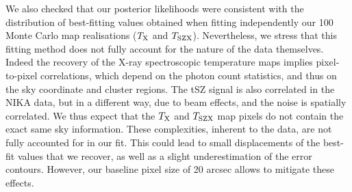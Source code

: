 \documentclass[twocolumn,traditabstract]{aa}
\newcommand{\ccor}[1]{\textcolor{Mypink}{#1}}
\def\TSZ {T_{\rm SZX}}
\def \TX {T_{\rm X}}
\begin{document}
\ccor{We also checked that our posterior likelihoods were consistent with the distribution of best-fitting values obtained when fitting independently our 100 Monte Carlo map realisations ($\TX$ and $\TSZ$). Nevertheless, we stress that this fitting method does not fully account for the nature of the data themselves. Indeed the recovery of the X-ray spectroscopic temperature maps implies pixel-to-pixel correlations, which depend on the photon count statistics, and thus on the sky coordinate and cluster regions. The tSZ signal is also correlated in the NIKA data, but in a different way, due to beam effects, and the noise is spatially correlated. We thus expect that the $\TX$ and $\TSZ$ map pixels do not contain the exact same sky information. These complexities, inherent to the data, are not fully accounted for in our fit. This could lead to small displacements of the best-fit values that we recover, as well as a slight underestimation of the error contours. However, our baseline pixel size of 20 arcsec allows to mitigate these effects.}
\end{document}
